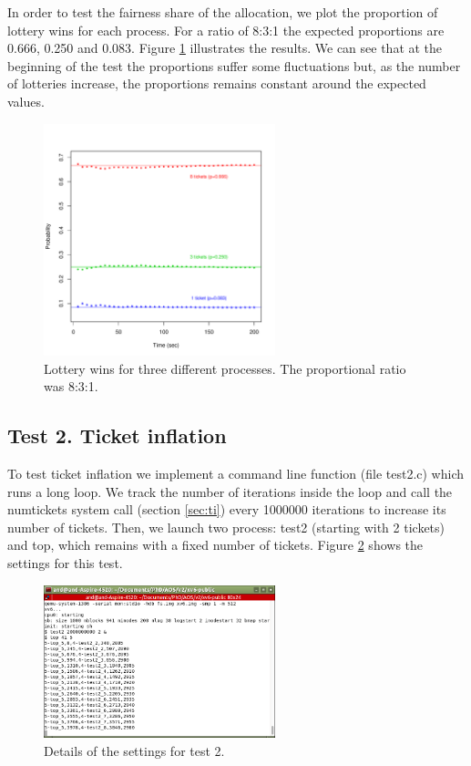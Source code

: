 \documentclass[10pt]{scrartcl}
\begin{document}
In order to test the fairness share of the allocation, we plot the proportion of lottery wins for each process.  For a ratio of 8:3:1 the expected proportions are 0.666, 0.250 and 0.083.  Figure \ref{fig:test1b} illustrates the results.  We can see that at the beginning of the test the proportions suffer some fluctuations but, as the number of lotteries increase, the proportions remains constant around the expected values.

\begin{figure}
  \centering
  \includegraphics[width=0.6\textwidth]{test1b}
  \caption{Lottery wins for three different processes. The proportional ratio was 8:3:1.}\label{fig:test1b}
\end{figure}

\subsection{Test 2. Ticket inflation}
To test ticket inflation we implement a command line function (file test2.c) which runs a long loop.  We track the number of iterations inside the loop and call the numtickets system call (section \ref{sec:ti}) every 1000000 iterations to increase its number of tickets. Then, we launch two process: test2 (starting with 2 tickets) and top, which remains with a fixed number of tickets.  Figure \ref{fig:test2a} shows the settings for this test.  

\begin{figure}
  \centering
  \includegraphics[width=0.6\textwidth]{test2c.png}
  \caption{Details of the settings for test 2.}\label{fig:test2a}
\end{figure}
\end{document}
